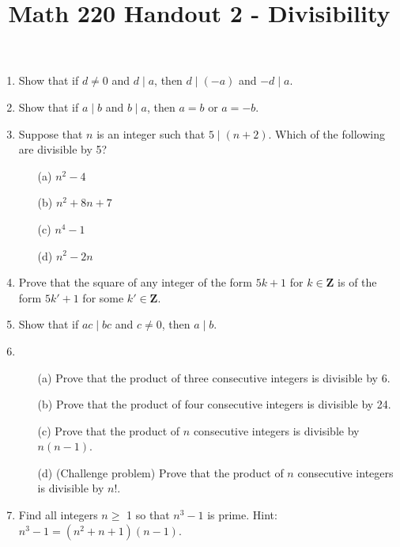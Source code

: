 \documentclass[12pt, reqno]{amsart}
\begin{document}
\title[Math 220 Handout 2 - Divisibility]{Math 220 Handout 2 - Divisibility}\maketitle

\begin{enumerate}

\item Show that if $d \neq 0$ and $d\mid a$, then $d\mid(-a)$ and $-d\mid a$.

\item Show that if $a\mid b$ and $b\mid a$, then $a=b$ or $a=-b$.

\item Suppose that $n$ is an integer such that $5\mid (n + 2)$. Which of the following are divisible by 5? 
 \begin{enumerate}
 \item [(a)] $n^2 -4$
 \item [(b)] $n^2 +8n+7$
 \item [(c)] $n^4 -1$
 \item [(d)] $n^2 - 2n$ \end{enumerate} 
\item Prove that the square of any integer of the form $5k + 1$ for $k \in \mathbf{Z}$ is of the form $5k' + 1$ for some $k' \in \mathbf{Z}$.

\item Show that if $ ac\mid bc$ and $c \neq 0$, then $a\mid b$.

\vspace{15pt}

\item 
  \begin{enumerate}
 \item [(a)] Prove that the product of three consecutive integers is divisible by 6.
 \item [(b)] Prove that the product of four consecutive integers is divisible by 24.
 \item [(c)] Prove that the product of $n$ consecutive integers is divisible by $n(n-1)$.
 \item [(d)] (Challenge problem) Prove that the product of $n$ consecutive integers is divisible by $n!$.
 
 
 \end{enumerate}

\item Find all integers $n \geq$ 1 so that $n^3 -1$ is prime. Hint: $n^3 -1 = (n^2 +n+1)(n-1)$. 


\end{enumerate}
\end{document}

